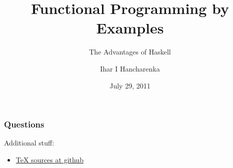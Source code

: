 \documentclass[compress,red]{beamer}
\title{Functional Programming by Examples}
\subtitle{The Advantages of Haskell}
\author{Ihar I Hancharenka}
\institute{EPAM Systems}
\date{July 29, 2011}
\begin{document}
\begin{frame}[containsverbatim]
\frametitle{Questions}
Additional stuff:
\begin{itemize}
	\item {\color{Blue} \href{https://github.com/iharh/fp-by-example}{TeX sources at github} }
\end{itemize}

\end{frame}
\end{document}
